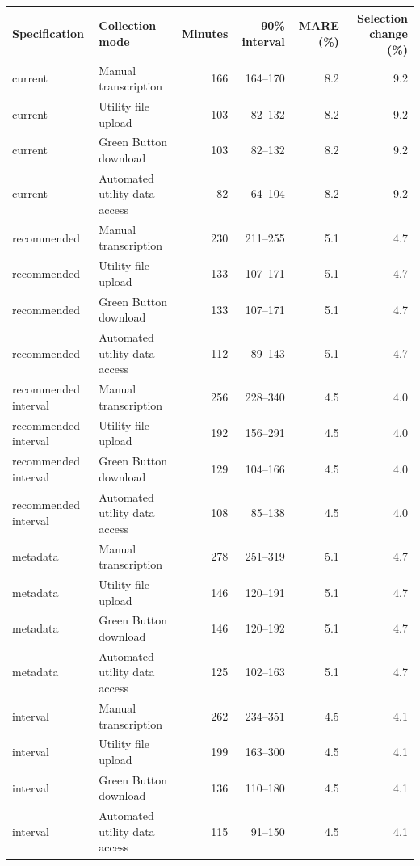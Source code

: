 \begin{tabular}{llrrrr}
\hline
Specification & Collection mode & Minutes & 90\% interval & MARE (\%) & Selection change (\%) \\
\hline
current & Manual transcription & 166 & 164--170 & 8.2 & 9.2 \\
current & Utility file upload & 103 & 82--132 & 8.2 & 9.2 \\
current & Green Button download & 103 & 82--132 & 8.2 & 9.2 \\
current & Automated utility data access & 82 & 64--104 & 8.2 & 9.2 \\
recommended & Manual transcription & 230 & 211--255 & 5.1 & 4.7 \\
recommended & Utility file upload & 133 & 107--171 & 5.1 & 4.7 \\
recommended & Green Button download & 133 & 107--171 & 5.1 & 4.7 \\
recommended & Automated utility data access & 112 & 89--143 & 5.1 & 4.7 \\
recommended interval & Manual transcription & 256 & 228--340 & 4.5 & 4.0 \\
recommended interval & Utility file upload & 192 & 156--291 & 4.5 & 4.0 \\
recommended interval & Green Button download & 129 & 104--166 & 4.5 & 4.0 \\
recommended interval & Automated utility data access & 108 & 85--138 & 4.5 & 4.0 \\
metadata & Manual transcription & 278 & 251--319 & 5.1 & 4.7 \\
metadata & Utility file upload & 146 & 120--191 & 5.1 & 4.7 \\
metadata & Green Button download & 146 & 120--192 & 5.1 & 4.7 \\
metadata & Automated utility data access & 125 & 102--163 & 5.1 & 4.7 \\
interval & Manual transcription & 262 & 234--351 & 4.5 & 4.1 \\
interval & Utility file upload & 199 & 163--300 & 4.5 & 4.1 \\
interval & Green Button download & 136 & 110--180 & 4.5 & 4.1 \\
interval & Automated utility data access & 115 & 91--150 & 4.5 & 4.1 \\
\hline
\end{tabular}
